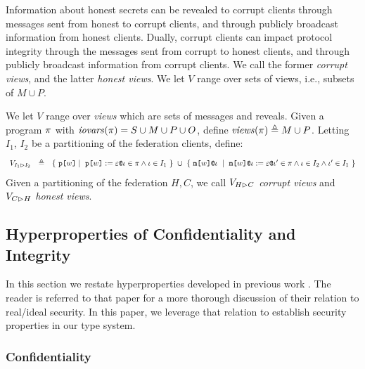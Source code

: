 Information about honest secrets can be revealed to corrupt clients
through messages sent from honest to corrupt clients, and through
publicly broadcast information from honest clients. Dually,
corrupt clients can impact protocol integrity through the messages
sent from corrupt to honest clients, and through publicly broadcast information
from corrupt clients. We call the former \emph{corrupt views}, and
the latter \emph{honest views}. We let $V$ range over sets
of views, i.e., subsets of $M \cup P$.
\begin{definition}
  We let $V$ range over \emph{views} which are sets of messages
  and reveals. Given a program $\pi$ with $\mathit{iovars}(\pi) = S \cup M \cup P \cup O$,
  define $\mathit{views}(\pi) \triangleq M \cup P$. Letting $I_1$, $I_2$ be
  a partitioning of the federation clients, define:
  $$
  \begin{array}{lcl}
    V_{I_1 \rhd I_2} & \defeq
        & \{\ \rvl{w} \mid\ \reveal{w}{\be}{\cid} \in \prog \wedge \cid \in I_1 \ \}\ \cup\ %
    \{\ \elab{\mesg{w}}{\cid}\ \mid\  \eassign{\mesg{w}}{\cid}{\be}{\cid'} \in
           \prog \wedge \cid \in I_2 \wedge \cid' \in I_1 \ \} 
  \end{array}
  $$
  Given a partitioning of the federation $H,C$, we call $V_{H \rhd C}$
  \emph{corrupt views} and $V_{C \rhd H}$ \emph{honest views}.
\end{definition}

\subsection{Hyperproperties of Confidentiality and Integrity}

In this section we restate hyperproperties developed in previous work
\cite{skalka-near-ppdp24}. The reader is referred to that paper for a more
thorough discussion of their relation to real/ideal security. In this
paper, we leverage that relation to establish security properties in
our type system.

\subsubsection{Confidentiality}

